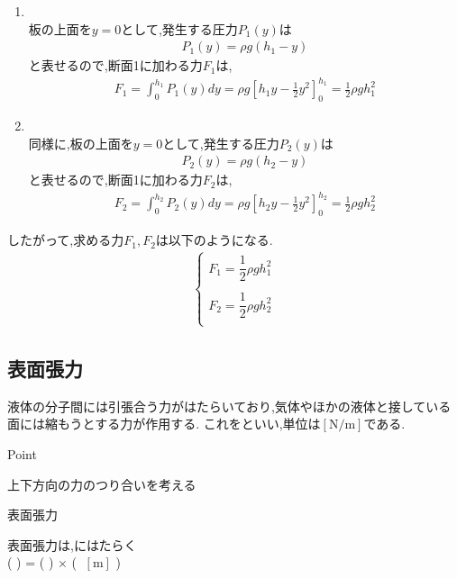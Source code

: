 \documentclass[a4paper]{jsarticle}
\begin{document}
\begin{enumerate}[(1)]
    \item {}\\
          板の上面を$y=0$として,発生する圧力$P_1\left(y\right)$は
          \begin{eqnarray*}
              P_1\left(y\right)=\rho g \left(h_1-y\right)
          \end{eqnarray*}
          と表せるので,断面1に加わる力$F_1$は,
          \begin{eqnarray*}
              F_1=\int_0^{h_1} P_1\left(y\right)dy =\rho g \left[h_1y - \frac{1}{2}y^2\right]_0^{h_1} = \frac{1}{2}\rho g h_1^2
          \end{eqnarray*}
    \item {}\\
          同様に,板の上面を$y=0$として,発生する圧力$P_2\left(y\right)$は
          \begin{eqnarray*}
              P_2\left(y\right)=\rho g \left(h_2-y\right)
          \end{eqnarray*}
          と表せるので,断面1に加わる力$F_2$は,
          \begin{eqnarray*}
              F_2=\int_0^{h_2} P_2\left(y\right)dy =\rho g \left[h_2y - \frac{1}{2}y^2\right]_0^{h_2} = \frac{1}{2}\rho g h_2^2
          \end{eqnarray*}
\end{enumerate}
したがって,求める力$F_1,F_2$は以下のようになる.
\begin{eqnarray*}
    \begin{cases}
        F_1= \dfrac{1}{2}\rho g h_1^2 \\
        \\
        F_2= \dfrac{1}{2}\rho g h_2^2 \\
    \end{cases}
\end{eqnarray*}
\subsection{表面張力}
液体の分子間には引張合う力がはたらいており,気体やほかの液体と接している面には縮もうとする力が作用する.
これをといい,単位は$\left[\mathrm{N/m}\right]$である.
\begin{itembox}[l]{Point}
    \begin{center}
        上下方向の力のつり合いを考える\\
    \end{center}
\end{itembox}
\begin{itembox}[l]{表面張力}
    \begin{center}
        表面張力は,にはたらく\\
        (  ) = ( ) $\times$ ( $\;\left[\mathrm{m}\right]$ )
    \end{center}
\end{itembox}
\end{document}
